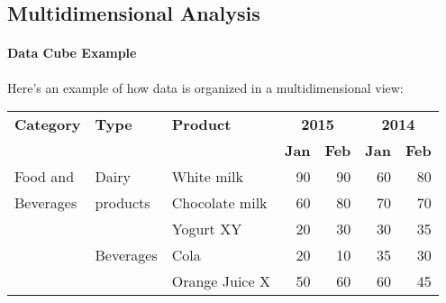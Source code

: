 \documentclass[a4paper,11pt]{article}
\begin{document}
\subsection{Multidimensional Analysis}

\paragraph{Data Cube Example}
Here's an example of how data is organized in a multidimensional view:

\begin{center}
\begin{tabular}{|l|l|l|r|r|r|r|}
    \hline
    \textbf{Category} & \textbf{Type} & \textbf{Product} & \multicolumn{2}{c|}{\textbf{2015}} & \multicolumn{2}{c|}{\textbf{2014}} \\
    \cline{4-7}
    & & & \textbf{Jan} & \textbf{Feb} & \textbf{Jan} & \textbf{Feb} \\
    \hline
    Food and & Dairy & White milk & 90 & 90 & 60 & 80 \\
    Beverages & products & Chocolate milk & 60 & 80 & 70 & 70 \\
    & & Yogurt XY & 20 & 30 & 30 & 35 \\
    \cline{2-7}
    & Beverages & Cola & 20 & 10 & 35 & 30 \\
    & & Orange Juice X & 50 & 60 & 60 & 45 \\
    \hline
\end{tabular}
\end{center}
\end{document}
